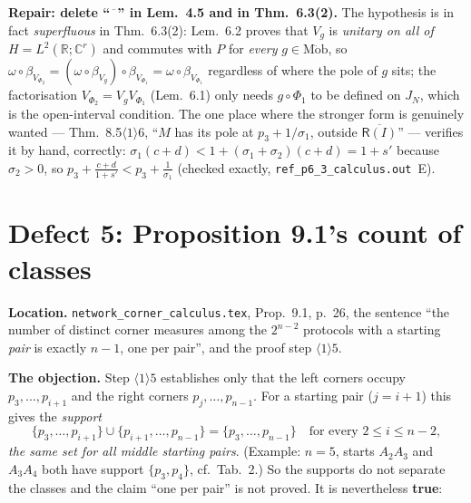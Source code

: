 \documentclass[11pt]{article}
\newcommand{\Mob}{\operatorname{M\ddot ob}}
\newcommand{\Rp}{\mathsf R}
\newcommand{\doc}{\texttt{network\_corner\_calculus.tex}}
\theoremstyle{definition}\newtheorem{example}[theorem]{Example}
\begin{document}
\begin{verdictgap}
\textbf{Repair: delete ``$\overline{\phantom{x}}$'' in Lem.~4.5 and in Thm.~6.3(2).}  The
hypothesis is in fact \emph{superfluous} in Thm.~6.3(2): Lem.~6.2 proves that $V_g$ is
\emph{unitary on all of} $H=L^2(\mathbb R;\mathbb C^r)$ and commutes with $P$ for
\emph{every} $g\in\Mob$, so
$\omega\circ\beta_{V_{\Phi_2}}=(\omega\circ\beta_{V_g})\circ\beta_{V_{\Phi_1}}
=\omega\circ\beta_{V_{\Phi_1}}$ regardless of where the pole of $g$ sits; the
factorisation $V_{\Phi_2}=V_gV_{\Phi_1}$ (Lem.~6.1) only needs $g\circ\Phi_1$ to be
defined on $J_N$, which is the open-interval condition.  The one place where the stronger
form is genuinely wanted --- Thm.~8.5$\langle1\rangle6$, ``$M$ has its pole at
$p_3+1/\sigma_1$, outside $\overline{\Rp(I)}$'' --- verifies it by hand, correctly:
$\sigma_1(c+d)<1+(\sigma_1+\sigma_2)(c+d)=1+s'$ because $\sigma_2>0$, so
$p_3+\frac{c+d}{1+s'}<p_3+\frac1{\sigma_1}$ (checked exactly,
\texttt{ref\_p6\_3\_calculus.out}~E).
\end{verdictgap}

\section{Defect 5: Proposition 9.1's count of classes}\label{sec:d5}

\textbf{Location.}  \doc, Prop.~9.1, p.~26, the sentence ``the number of distinct corner
measures among the $2^{n-2}$ protocols with a starting \emph{pair} is exactly $n-1$, one
per pair'', and the proof step $\langle1\rangle5$.

\textbf{The objection.}  Step $\langle1\rangle5$ establishes only that the left corners
occupy $p_3,\dots,p_{i+1}$ and the right corners $p_j,\dots,p_{n-1}$.  For a starting pair
($j=i+1$) this gives the \emph{support}
\[
 \{p_3,\dots,p_{i+1}\}\cup\{p_{i+1},\dots,p_{n-1}\}
 =\{p_3,\dots,p_{n-1}\}\quad\text{for every }2\le i\le n-2,
\]
\emph{the same set for all middle starting pairs}.  (Example: $n=5$, starts $A_2A_3$ and
$A_3A_4$ both have support $\{p_3,p_4\}$, cf.\ Tab.~2.)  So the supports do not separate
the classes and the claim ``one per pair'' is not proved.  It is nevertheless \textbf{true}:
\end{document}
